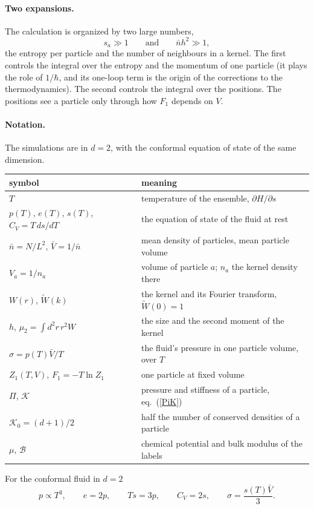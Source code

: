 \documentclass[11pt,aps,preprint,nofootinbib,superscriptaddress,tightenlines]{revtex4-2}
\newcommand{\klab}{\mathcal B}
\def\st{\begin{equation}}
\def\stp{\end{equation}}
\def\Eq#1{eq.~(\ref{#1})}
\let\oldparagraph\paragraph
\renewcommand{\paragraph}{\par\bigskip\oldparagraph}
\begin{document}
\paragraph{Two expansions.}  The calculation is organized by two large numbers,
\st
s_a\gg1\qquad\text{and}\qquad\bar nh^2\gg1 ,
\stp
the entropy per particle and the number of neighbours in a kernel.  The first controls the integral over the entropy and the momentum of one particle (it
plays the role of $1/\hbar$, and its one-loop term is the origin of the corrections to the thermodynamics).  The second controls the integral over the
positions.  The positions see a particle only through how $F_1$ depends on $V$.

\paragraph{Notation.}  The simulations are in $d=2$, with the conformal equation of state of the same dimension.
\begin{center}
\begin{tabular}{ll}
\toprule
symbol & meaning \\
\midrule
$T$ & temperature of the ensemble, $\partial H/\partial s$ \\
$p(T)$, $e(T)$, $s(T)$, $C_V=T\,ds/dT$ & the equation of state of the fluid at rest \\
$\bar n=N/L^2$, $\bar V=1/\bar n$ & mean density of particles, mean particle volume \\
$V_a=1/n_a$ & volume of particle $a$; $n_a$ the kernel density there \\
$W(r)$, $\widetilde W(k)$ & the kernel and its Fourier transform, $\widetilde W(0)=1$ \\
$h$, $\mu_2=\int d^2r\,r^2W$ & the size and the second moment of the kernel \\
$\sigma=p(T)\bar V/T$ & the fluid's pressure in one particle volume, over $T$ \\
$Z_1(T,V)$, $F_1=-T\ln Z_1$ & one particle at fixed volume \\
$\Pi$, $\mathcal K$ & pressure and stiffness of a particle, \Eq{PiK} \\
$\mathcal K_0=(d+1)/2$ & half the number of conserved densities of a particle \\
$\mu$, $\klab$ & chemical potential and bulk modulus of the labels \\
\bottomrule
\end{tabular}
\end{center}
For the conformal fluid in $d=2$
\st
p\propto T^3,\qquad e=2p,\qquad Ts=3p,\qquad C_V=2s,\qquad \sigma=\frac{s(T)\bar V}3 .
\stp
\end{document}

